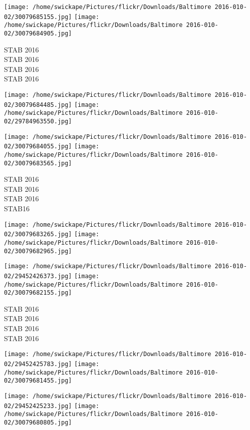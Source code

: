 \documentclass[10pt,letterpaper]{article}
\begin{document}
\texttt{[image: /home/swickape/Pictures/flickr/Downloads/Baltimore 2016-010-02/30079685155.jpg]}
\texttt{[image: /home/swickape/Pictures/flickr/Downloads/Baltimore 2016-010-02/30079684905.jpg]}

STAB 2016\\
STAB 2016\\
STAB 2016\\
STAB 2016\\
\pagebreak

\texttt{[image: /home/swickape/Pictures/flickr/Downloads/Baltimore 2016-010-02/30079684485.jpg]}
\texttt{[image: /home/swickape/Pictures/flickr/Downloads/Baltimore 2016-010-02/29784963550.jpg]}

\texttt{[image: /home/swickape/Pictures/flickr/Downloads/Baltimore 2016-010-02/30079684055.jpg]}
\texttt{[image: /home/swickape/Pictures/flickr/Downloads/Baltimore 2016-010-02/30079683565.jpg]}

STAB 2016\\
STAB 2016\\
STAB 2016\\
STAB16\\
\pagebreak

\texttt{[image: /home/swickape/Pictures/flickr/Downloads/Baltimore 2016-010-02/30079683265.jpg]}
\texttt{[image: /home/swickape/Pictures/flickr/Downloads/Baltimore 2016-010-02/30079682965.jpg]}

\texttt{[image: /home/swickape/Pictures/flickr/Downloads/Baltimore 2016-010-02/29452426373.jpg]}
\texttt{[image: /home/swickape/Pictures/flickr/Downloads/Baltimore 2016-010-02/30079682155.jpg]}

STAB 2016\\
STAB 2016\\
STAB 2016\\
STAB 2016\\
\pagebreak

\texttt{[image: /home/swickape/Pictures/flickr/Downloads/Baltimore 2016-010-02/29452425783.jpg]}
\texttt{[image: /home/swickape/Pictures/flickr/Downloads/Baltimore 2016-010-02/30079681455.jpg]}

\texttt{[image: /home/swickape/Pictures/flickr/Downloads/Baltimore 2016-010-02/29452425233.jpg]}
\texttt{[image: /home/swickape/Pictures/flickr/Downloads/Baltimore 2016-010-02/30079680805.jpg]}
\end{document}
